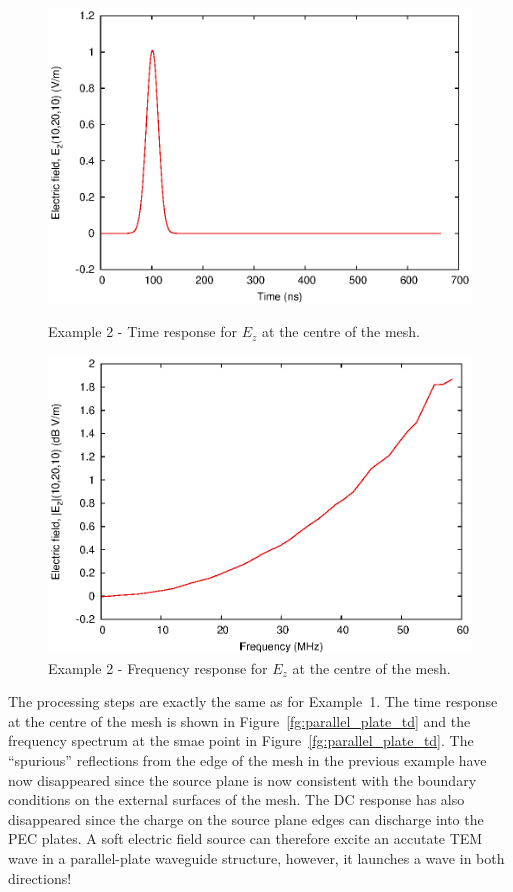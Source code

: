 \documentclass[onecolumn,a4paper]{article}
\numberwithin{equation}{section}
\begin{document}
\begin{figure}[ht!]
 \centerline{\includegraphics[width=12cm]{figures/parallel_plate_td}}
 \caption{\label{fg:parallel_plate_td} Example 2 - Time response for $E_z$ at the centre of the mesh.}
 \centerline{\includegraphics[width=12cm]{figures/parallel_plate_fd}}
 \caption{\label{fg:parallel_plate_fd} Example 2 - Frequency response for $E_z$ at the centre of the mesh.}
\end{figure}

The processing steps are exactly the same as for Example~1. The time response at the centre 
of the mesh is shown in Figure~\ref{fg:parallel_plate_td} and the frequency spectrum at the
smae point in Figure~\ref{fg:parallel_plate_td}. The ``spurious'' reflections from the edge of 
the mesh in the previous example 
have now disappeared since the source plane is now consistent with the boundary
conditions on the external surfaces of the mesh. The DC response has also disappeared
since the charge on the source plane edges can discharge into the PEC plates. A
soft electric field source can therefore excite an accutate TEM wave in a parallel-plate
waveguide structure, however, it launches a wave in both directions!
\end{document}
